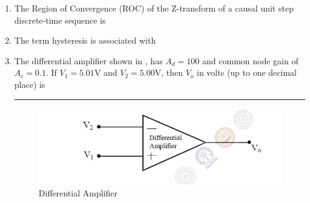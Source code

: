 \documentclass[journal,12pt,onecolumn]{IEEEtran}
\theoremstyle{remark}
\begin{document}
\begin{enumerate}
\item The Region of Convergence (ROC) of the Z-transform of a causal unit step discrete-time sequence is \par \hfill{}
\begin{enumerate}
\end{enumerate}

\item The term hysteresis is associated with \par \hfill{}
\begin{enumerate}
\end{enumerate}

\item The differential amplifier shown in , has $A_d = 100$ and common node gain of $A_c = 0.1$. If $V_1 = 5.01\text{V}$ and $V_2 = 5.00\text{V}$, then $V_o$ in volts (up to one decimal place) is \rule{1.5cm}{0.4pt} \par \hfill{}
\begin{figure}[H]
    \centering
    \includegraphics[width=0.7\columnwidth]{Figs/Q-14.png}
    \caption{Differential Amplifier}
    \label{fig:placeholder_6}
\end{figure}


\end{enumerate}
\end{document}
